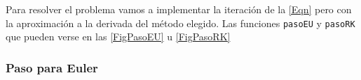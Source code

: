 Para resolver el problema vamos a implementar la iteración de la \autoref{Eqn}
pero con la aproximación a la derivada del método elegido. 
Las funciones \texttt{pasoEU} y \texttt{pasoRK} que pueden verse
en las  \autoref{FigPasoEU} u \autoref{FigPasoRK} 

\mode*

\begin{frame}[label=FramePasoEU]
  \frametitle<presentation>{Paso para Euler}
  \begin{figure}
  \end{figure}
\end{frame}


\begin{figure}
  \caption{\protect\label{FigPasoRK}}
\end{figure}
